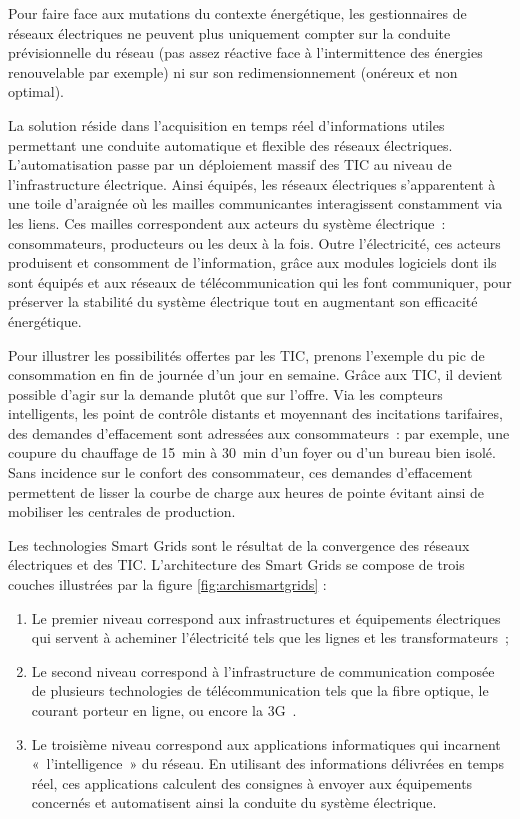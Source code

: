 Pour faire face aux mutations du contexte énergétique, les gestionnaires de réseaux électriques ne peuvent plus uniquement compter sur la conduite prévisionnelle du réseau (pas assez réactive face à l'intermittence des énergies renouvelable par exemple) ni sur son redimensionnement (onéreux et non optimal). 

La solution réside dans l'acquisition en temps réel d'informations utiles permettant une conduite automatique et flexible des réseaux électriques. L'automatisation passe par un déploiement massif des TIC au niveau de l'infrastructure électrique. Ainsi équipés, les réseaux électriques s'apparentent à une toile d'araignée où les mailles communicantes interagissent constamment via les liens. Ces mailles correspondent aux acteurs du système électrique~: consommateurs, producteurs ou les deux à la fois. 
Outre l'électricité, ces acteurs produisent et consomment de l'information, grâce aux modules logiciels dont ils sont équipés et aux réseaux de télécommunication qui les font communiquer, pour préserver la stabilité du système électrique tout en augmentant son efficacité énergétique. 

Pour illustrer les possibilités offertes par les TIC, prenons l'exemple du pic de consommation en fin de journée d'un jour en semaine. Grâce aux TIC, il devient possible d'agir sur la demande plutôt que sur l'offre. Via les compteurs intelligents, les point de contrôle distants et moyennant des incitations tarifaires, des demandes d'effacement sont adressées aux consommateurs~: par exemple, une coupure du chauffage de 15~min à 30~min d'un foyer ou d'un bureau bien isolé. Sans incidence sur le confort des consommateur, ces demandes d'effacement permettent de lisser la courbe de charge aux heures de pointe évitant ainsi de mobiliser les centrales de production. 

Les technologies Smart Grids sont le résultat de la convergence des réseaux électriques et des TIC. L'architecture des Smart Grids se compose de trois couches illustrées par la figure \ref{fig:archismartgrids} :
\begin{enumerate}
\item Le premier niveau correspond aux infrastructures et équipements électriques qui servent à acheminer l'électricité tels que les lignes et les transformateurs~; 
\item Le second niveau correspond à l'infrastructure de communication composée de plusieurs technologies de télécommunication tels que la fibre optique, le courant porteur en ligne, ou encore la 3G~. 
\item Le troisième niveau correspond aux applications informatiques qui incarnent «~l'intelligence~» du réseau.  En utilisant des informations délivrées en temps réel, ces applications calculent des consignes à envoyer aux équipements concernés et automatisent ainsi la conduite du système électrique.
\end{enumerate}


